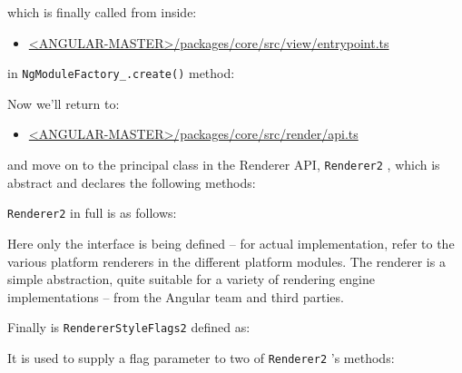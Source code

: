 

which is finally called from inside:

\begin{itemize}
  \item \href{https://github.com/angular/angular/blob/master/packages/core/src/view/entrypoint.ts}
        {<ANGULAR-MASTER>/packages/core/src/view/entrypoint.ts}
\end{itemize}

in
\texttt{NgModuleFactory\_.create()}
method:



Now we’ll return to:

\begin{itemize}
  \item \href{https://github.com/angular/angular/blob/master/packages/core/src/render/api.ts}
        {<ANGULAR-MASTER>/packages/core/src/render/api.ts}
\end{itemize}

and move on to the principal class in the Renderer API,
\texttt{Renderer2}
, which is abstract
and declares the following methods:

\texttt{Renderer2}
in full is as follows:



Here only the interface is being defined – for actual implementation, refer to the
various platform renderers in the different platform modules. The renderer is a simple
abstraction, quite suitable for a variety of rendering engine implementations – from
the Angular team and third parties.

Finally is
\texttt{RendererStyleFlags2}
defined as:



It is used to supply a flag parameter to two of
\texttt{Renderer2}
’s methods:




